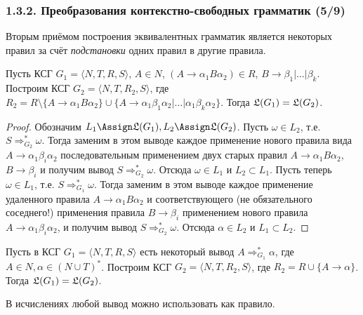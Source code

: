 \begin{frame}
\frametitle{1.3.2. Преобразования контекстно-свободных грамматик (5/9)}

Вторым приёмом построения эквивалентных грамматик 
является  
некоторых правил за счёт {\em подстановки} 
одних правил в другие правила.

\smallskip
\begin{theorem}
Пусть КСГ $G_1=\langle N, T, R, S\rangle$,
$A\in N$, $(A\to \alpha_1 B \alpha_2)\in R$,
$B \to \beta_1 |\dots|\beta_k$.
Построим КСГ $G_2=\langle N, T, R_2, S\rangle$,
где $R_2=R\setminus \{A\to \alpha_1 B \alpha_2\}
\cup\{A\to \alpha_1\beta_1\alpha_2|\dots|\alpha_1\beta_k\alpha_2\}$. 
Тогда $\frak{L}(G_1)=\frak{L}(G_2)$.
\end{theorem}

\begin{proof}
Обозначим $L_1\Assign\frak{L}(G_1), L_2\Assign\frak{L}(G_2)$. 
Пусть $\omega\in L_2$, т.е. $S\Rightarrow^*_{G_2} \omega$.
Тогда заменим в этом выводе 
каждое применение нового правила вида
$A\to\alpha_1\beta_i\alpha_2$ последовательным
применением двух старых правил $A\to\alpha_1 B\alpha_2$, 
$B\to\beta_i$ и получим вывод 
$S\Rightarrow^*_{G_2} \omega$.
Отсюда $\omega\in L_1$ и $L_2\subset L_1$.
Пусть теперь $\omega\in L_1$, т.е. $S\Rightarrow^*_{G_1} \omega$.
Тогда заменим в этом выводе 
каждое применение удаленного правила 
$A\to\alpha_1 B \alpha_2$ и соответствующего
(не обязательного соседнего!) 
применения правила $B\to\beta_i$
применением нового правила $A\to\alpha_1 \beta_i\alpha_2$, 
 и получим вывод 
$S\Rightarrow^*_{G_2} \omega$.
Отсюда $\alpha\in L_2$ и $L_1\subset L_2$.
\end{proof}

\begin{corollary} Пусть в КСГ 
$G_1=\langle N, T, R , S \rangle$
есть некоторый вывод $A\Rightarrow^*_{G_1}\alpha$,
где \\$A\in N, \alpha\in (N\cup T)^*$.
Построим КСГ $G_2=\langle N, T, R_2, S \rangle$,
где $R_2=R\cup\{A\to \alpha\}$.
Тогда $\frak{L}(G_1)=\frak{L}(G_2)$.
\end{corollary}

\begin{remark}
В исчислениях любой вывод можно использовать как 
 правило.
\end{remark}

\end{frame}


